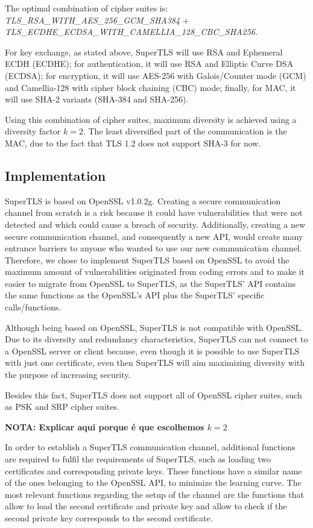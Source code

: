 \documentclass{sig-alternate-05-2015}
\begin{document}
The optimal combination of cipher suites is:\\
\textit{TLS\_RSA\_WITH\_AES\_256\_GCM\_SHA384} + \\\textit{TLS\_ECDHE\_ECDSA\_WITH\_CAMELLIA\_128\_CBC\_SHA256}.

For key exchange, as stated above, SuperTLS will use RSA and Ephemeral ECDH (ECDHE); for authentication, it will use RSA and Elliptic Curve DSA (ECDSA); for encryption, it will use AES-256 with Galois/Counter mode (GCM) and Camellia-128 with cipher block chaining (CBC) mode; finally, for MAC, it will use SHA-2 variants (SHA-384 and SHA-256).

Using this combination of cipher suites, maximum diversity is achieved using a diversity factor $k = 2$. The least diversified part of the communication is the MAC, due to the fact that TLS 1.2 does not support SHA-3 for now.

\subsection{Implementation}

SuperTLS is based on OpenSSL v1.0.2g. Creating a secure communication channel from scratch is a risk because it could have vulnerabilities that were not detected and which could cause a breach of security. Additionally, creating a new secure communication channel, and consequently a new API, would create many entrance barriers to anyone who wanted to use our new communication channel. Therefore, we chose to implement SuperTLS based on OpenSSL to avoid the maximum amount of vulnerabilities originated from coding errors and to make it easier to migrate from OpenSSL to SuperTLS, as the SuperTLS' API contains the same functions as the OpenSSL's API plus the SuperTLS' specific calls/functions.

Although being based on OpenSSL, SuperTLS is not compatible with OpenSSL. Due to its diversity and redundancy characteristics, SuperTLS can not connect to a OpenSSL server or client because, even though it is possible to use SuperTLS with just one certificate, even then SuperTLS will aim maximizing diversity with the purpose of increasing security.

Besides this fact, SuperTLS does not support all of OpenSSL cipher suites, such as PSK and SRP cipher suites.

\textbf{NOTA: Explicar aqui porque \'e que escolhemos $k = 2$}

In order to establish a SuperTLS communication channel, additional functions are required to fulfil the requirements of SuperTLS, such as loading two certificates and corresponding private keys. These functions have a similar name of the ones belonging to the OpenSSL API, to minimize the learning curve.
The most relevant functions regarding the setup of the channel are the functions that allow to load the second certificate and private key and allow to check if the second private key corresponds to the second certificate.
\end{document}
